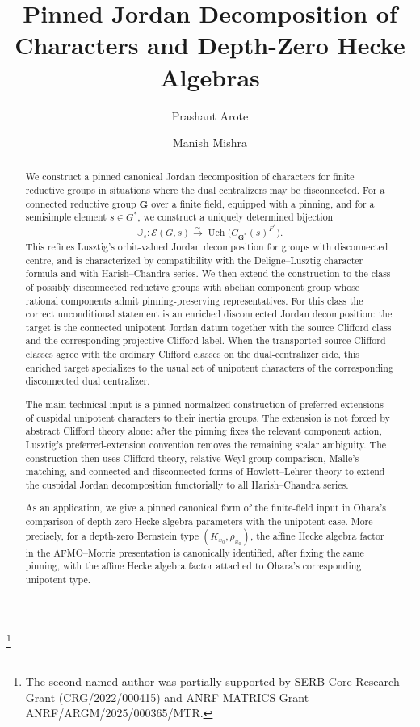 \documentclass{amsart}
\title{Pinned Jordan Decomposition of Characters and Depth-Zero Hecke Algebras}
\date{}
\theoremstyle{plain}
\numberwithin{equation}{section}
\theoremstyle{definition}
\newcommand{\cE}{\mathcal{E}}
\newcommand{\Uch}{\operatorname{Uch}}
\newcommand{\J}{\mathbb{J}}
\newcommand{\bG}{\mathbf{G}}
\begin{document}
\author{Prashant Arote}
\author{Manish Mishra}
\address{
Department of Mathematics \\
Indian Institute for Science Education and Research \\
Dr.\ Homi Bhabha Road, Pashan \\
Pune 411 008 \\
India
}
\thanks{The second named author was partially supported by SERB Core Research Grant
(CRG/2022/000415) and  ANRF MATRICS Grant ANRF/ARGM/2025/000365/MTR.}
\begin{abstract}
We construct a pinned canonical Jordan decomposition of characters for finite
reductive groups in situations where the dual centralizers may be disconnected.
For a connected reductive group \(\bG\) over a finite field, equipped with a
pinning, and for a semisimple element \(s\in G^*\), we construct a uniquely
determined bijection
\[
\J_s:\cE(G,s)\xrightarrow{\sim}\Uch\bigl(C_{\bG^*}(s)^{F^*}\bigr).
\]
This refines Lusztig's orbit-valued Jordan decomposition for groups with
disconnected centre, and is characterized by compatibility with the
Deligne--Lusztig character formula and with Harish--Chandra series.  We then
extend the construction to the class of possibly disconnected reductive groups
with abelian component group whose rational components admit pinning-preserving
representatives.  For this class the correct unconditional statement is an
enriched disconnected Jordan decomposition: the target is the connected
unipotent Jordan datum together with the source Clifford class and the
corresponding projective Clifford label.  When the transported source Clifford
classes agree with the ordinary Clifford classes on the dual-centralizer side,
this enriched target specializes to the usual set of unipotent characters of the
corresponding disconnected dual centralizer.

The main technical input is a pinned-normalized construction of preferred
extensions of cuspidal unipotent characters to their inertia groups.  The
extension is not forced by abstract Clifford theory alone: after the pinning
fixes the relevant component action, Lusztig's preferred-extension convention
removes the remaining scalar ambiguity.  The construction then uses Clifford
theory, relative Weyl group comparison, Malle's matching, and connected and
disconnected forms of Howlett--Lehrer theory to extend the cuspidal Jordan
decomposition functorially to all Harish--Chandra series.

As an application, we give a pinned canonical form of the finite-field input in
Ohara's comparison of depth-zero Hecke algebra parameters with the unipotent
case.  More precisely, for a depth-zero Bernstein type
\((K_{x_0},\rho_{x_0})\), the affine Hecke algebra factor in the
AFMO--Morris presentation is canonically identified, after fixing the same
pinning, with the affine Hecke algebra factor attached to Ohara's corresponding
unipotent type.  
\end{abstract}
\end{document}
